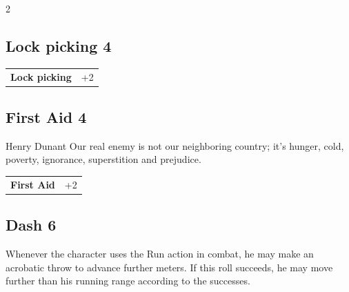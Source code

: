 \begin{multicols}{2}
\begin{tcolorbox}

\end{tcolorbox}

\begin{tcolorbox}
    \subsection*{Lock picking \hfill \small{4 }}
    \tcblower




\begin{tabular}{@{}ll@{}}
    \textbf{Lock picking} & +2\\
\end{tabular}


\end{tcolorbox}

\begin{tcolorbox}
    \subsection*{First Aid \hfill \small{4 }}
    \tcblower


\begin{pquote}{Henry Dunant}
Our real enemy is not our neighboring country; it's hunger, cold, poverty, ignorance, superstition and prejudice.
\end{pquote}

\vspace{3mm}

\begin{tabular}{@{}ll@{}}
    \textbf{First Aid} & +2\\
\end{tabular}


\end{tcolorbox}

\begin{tcolorbox}
    \subsection*{Dash \hfill \small{6 }}
    \tcblower
Whenever the character uses the Run action in combat, he may make an acrobatic throw to advance further meters. If this roll succeeds, he may move further than his running range according to the successes. 


\end{tcolorbox}
\end{multicols}
